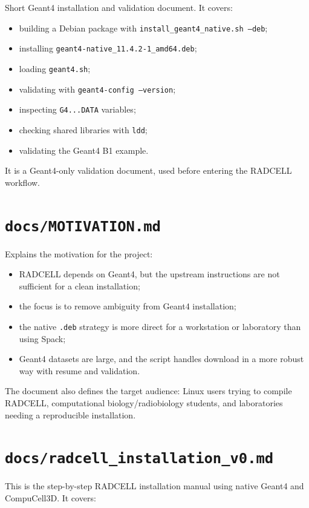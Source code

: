 \documentclass[11pt,a4paper,twoside,pdftex]{refrep}
\begin{document}
Short Geant4 installation and validation document. It covers:

\begin{itemize}
  \item building a Debian package with \texttt{install\_geant4\_native.sh --deb};
  \item installing \texttt{geant4-native\_11.4.2-1\_amd64.deb};
  \item loading \texttt{geant4.sh};
  \item validating with \texttt{geant4-config --version};
  \item inspecting \texttt{G4...DATA} variables;
  \item checking shared libraries with \texttt{ldd};
  \item validating the Geant4 B1 example.
\end{itemize}

It is a Geant4-only validation document, used before entering the RADCELL workflow.

\section{\texttt{docs/MOTIVATION.md}}

Explains the motivation for the project:

\begin{itemize}
  \item RADCELL depends on Geant4, but the upstream instructions are not sufficient for a clean installation;
  \item the focus is to remove ambiguity from Geant4 installation;
  \item the native \texttt{.deb} strategy is more direct for a workstation or laboratory than using Spack;
  \item Geant4 datasets are large, and the script handles download in a more robust way with resume and validation.
\end{itemize}

The document also defines the target audience: Linux users trying to compile RADCELL, computational biology/radiobiology students, and laboratories needing a reproducible installation.

\section{\texttt{docs/radcell\_installation\_v0.md}}

This is the step-by-step RADCELL installation manual using native Geant4 and CompuCell3D. It covers:
\end{document}
